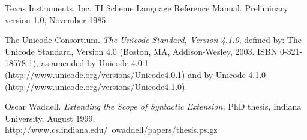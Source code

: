 \begin{thebibliography}{999}
Texas Instruments, Inc.
TI Scheme Language Reference Manual.
Preliminary version 1.0, November 1985. 

The Unicode Consortium.
{\em  The Unicode Standard, Version 4.1.0},
defined by: The Unicode Standard, Version 4.0 (Boston, MA,
Addison-Wesley, 2003. ISBN 0-321-18578-1), as amended by Unicode 4.0.1
({\cf http://www.unicode.org/versions/Unicode4.0.1})
and by Unicode 4.1.0 ({\cf http://www.unicode.org/versions/Unicode4.1.0}).

Oscar Waddell.
{\em Extending the Scope of Syntactic Extension.}
PhD thesis, Indiana University, August 1999.
{\cf http://www.cs.indiana.edu/~owaddell/papers/thesis.ps.gz}

\end{thebibliography}


